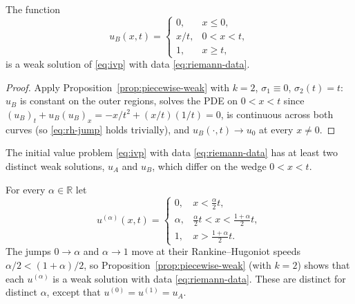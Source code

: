 \begin{proposition}
\label{prop:rarefaction-is-weak-solution}
The function
\begin{equation}
  \label{eq:rarefaction-solution}
  u_B(x,t) = \begin{cases}
    0, & x \le 0, \\
    x/t, & 0 < x < t, \\
    1, & x \ge t,
  \end{cases}
\end{equation}
is a weak solution of \eqref{eq:ivp} with data \eqref{eq:riemann-data}.
\end{proposition}

\begin{proof}
Apply Proposition~\ref{prop:piecewise-weak} with $k=2$, $\sigma_1\equiv0$,
$\sigma_2(t)=t$: $u_B$ is constant on the outer regions, solves the PDE on
$0<x<t$ since $(u_B)_t+u_B(u_B)_x=-x/t^2+(x/t)(1/t)=0$, is continuous across
both curves (so \eqref{eq:rh-jump} holds trivially), and
$u_B(\cdot,t)\to u_0$ at every $x\ne0$.
\end{proof}

\begin{corollary}
\label{cor:nonuniqueness}
The initial value problem \eqref{eq:ivp} with data \eqref{eq:riemann-data}
has at least two distinct weak solutions, $u_A$ and $u_B$, which differ on the
wedge $0<x<t$.
\end{corollary}

\begin{remark}
\label{rem:infinite-family}
For every $\alpha\in\mathbb{R}$ let
\begin{equation*}
  u^{(\alpha)}(x,t)=\begin{cases}
    0, & x<\tfrac{\alpha}{2}t,\\
    \alpha, & \tfrac{\alpha}{2}t<x<\tfrac{1+\alpha}{2}t,\\
    1, & x>\tfrac{1+\alpha}{2}t .
  \end{cases}
\end{equation*}
The jumps $0\to\alpha$ and $\alpha\to1$ move at their Rankine--Hugoniot speeds
$\alpha/2<(1+\alpha)/2$, so Proposition~\ref{prop:piecewise-weak} (with $k=2$)
shows that each $u^{(\alpha)}$ is a weak solution with data
\eqref{eq:riemann-data}. These are distinct for distinct $\alpha$, except that
$u^{(0)}=u^{(1)}=u_A$.
\end{remark}


